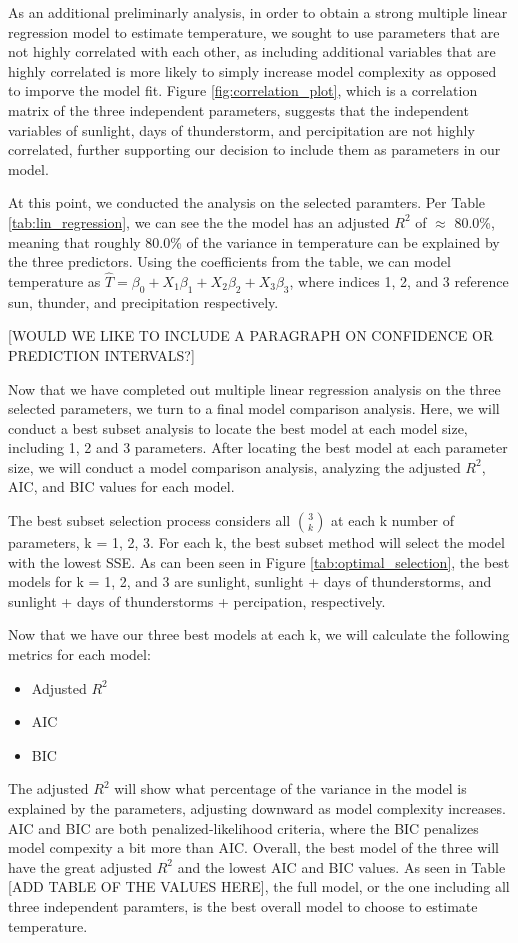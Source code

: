 As an additional preliminarly analysis, in order to obtain a strong multiple linear regression model to estimate temperature, we sought to use parameters that are not highly correlated with each other, as including additional variables that are highly correlated is more likely to simply increase model complexity as opposed to imporve the model fit. Figure \ref{fig:correlation_plot}, which is a correlation matrix of the three independent parameters, suggests that the independent variables of sunlight, days of thunderstorm, and percipitation are not highly correlated, further supporting our decision to include them as parameters in our model.

At this point, we conducted the analysis on the selected paramters. Per Table \ref{tab:lin_regression}, we can see the the model has an adjusted $R^{2}$ of $\approx$ 80.0\%, meaning that roughly 80.0\% of the variance in temperature can be explained by the three predictors. Using the coefficients from the table, we can model temperature as $\hat{T} = \beta_{0} + X_{1}\beta_{1} + X_{2}\beta_{2} + X_{3}\beta_{3}$, where indices 1, 2, and 3 reference sun, thunder, and precipitation respectively.

[WOULD WE LIKE TO INCLUDE A PARAGRAPH ON CONFIDENCE OR PREDICTION INTERVALS?]

Now that we have completed out multiple linear regression analysis on the three selected parameters, we turn to a final model comparison analysis. Here, we will conduct a best subset analysis to locate the best model at each model size, including 1, 2 and 3 parameters. After locating the best model at each parameter size, we will conduct a model comparison analysis, analyzing the adjusted $R^{2}$, AIC, and BIC values for each model.

The best subset selection process considers all $3 \choose k$ at each k number of parameters, k = 1, 2, 3. For each k, the best subset method will select the model with the lowest SSE. As can been seen in Figure \ref{tab:optimal_selection}, the best models for k = 1, 2, and 3 are sunlight, sunlight + days of thunderstorms, and sunlight + days of thunderstorms + percipation, respectively.

Now that we have our three best models at each k, we will calculate the following metrics for each model: 

\begin{itemize}
	\item Adjusted $R^{2}$
	\item AIC
	\item BIC
\end{itemize}

The adjusted $R^{2}$ will show what percentage of the variance in the model is explained by the parameters, adjusting downward as model complexity increases. AIC and BIC are both penalized-likelihood criteria, where the BIC penalizes model compexity a bit more than AIC. Overall, the best model of the three will have the great adjusted $R^{2}$ and the lowest AIC and BIC values. As seen in Table [ADD TABLE OF THE VALUES HERE], the full model, or the one including all three independent paramters, is the best overall model to choose to estimate temperature.